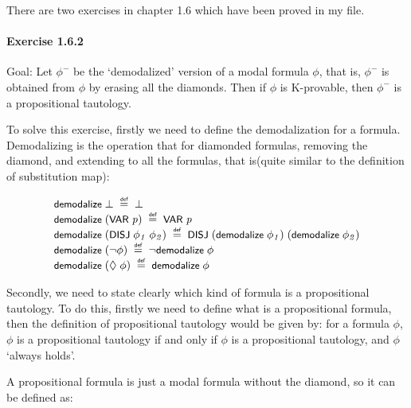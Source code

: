 \documentclass[letterpaper]{article}
\renewcommand{\HOLConst}[1]{{\textsf{\upshape\small #1}}}
\newenvironment{holmath}{\begin{displaymath}\begin{array}{l}}{\end{array}\end{displaymath}\ignorespacesafterend}
\begin{document}
There are two exercises in chapter 1.6 which have been proved in my file.

\paragraph{Exercise 1.6.2}

Goal: Let $\phi^-$ be the `demodalized' version of a modal formula $\phi$, that is, $\phi^-$ is obtained from $\phi$ by erasing all the diamonds. Then if $\phi$ is K-provable, then $\phi^-$ is a propositional tautology.

To solve this exercise, firstly we need to define the demodalization for a formula. Demodalizing is the operation that for diamonded formulas, removing the diamond, and extending to all the formulas, that is(quite similar to the definition of substitution map):

\begin{holmath}
  \HOLConst{demodalize}\;\HOLSymConst{\ensuremath{\bot}}\;\HOLSymConst{\HOLTokenDefEquality{}}\;\HOLSymConst{\ensuremath{\bot}}\\
\HOLConst{demodalize}\;(\HOLConst{VAR}\;\HOLFreeVar{p})\;\HOLSymConst{\HOLTokenDefEquality{}}\;\HOLConst{VAR}\;\HOLFreeVar{p}\\
\HOLConst{demodalize}\;(\HOLConst{DISJ}\;\HOLFreeVar{\ensuremath{\phi\sb{1}}}\;\HOLFreeVar{\ensuremath{\phi\sb{2}}})\;\HOLSymConst{\HOLTokenDefEquality{}}\;\HOLConst{DISJ}\;(\HOLConst{demodalize}\;\HOLFreeVar{\ensuremath{\phi\sb{1}}})\;(\HOLConst{demodalize}\;\HOLFreeVar{\ensuremath{\phi\sb{2}}})\\
\HOLConst{demodalize}\;(\HOLSymConst{\HOLTokenNeg{}}\HOLFreeVar{\ensuremath{\phi}})\;\HOLSymConst{\HOLTokenDefEquality{}}\;\HOLSymConst{\HOLTokenNeg{}}\HOLConst{demodalize}\;\HOLFreeVar{\ensuremath{\phi}}\\
\HOLConst{demodalize}\;(\HOLSymConst{\ensuremath{\Diamond}}\;\HOLFreeVar{\ensuremath{\phi}})\;\HOLSymConst{\HOLTokenDefEquality{}}\;\HOLConst{demodalize}\;\HOLFreeVar{\ensuremath{\phi}}
\end{holmath}

Secondly, we need to state clearly which kind of formula is a propositional tautology. To do this, firstly we need to define what is a propositional formula, then the definition of propositional tautology would be given by: for a formula $\phi$, $\phi$ is a propositional tautology if and only if $\phi$ is a propositional tautology, and $\phi$ `always holds'.

A propositional formula is just a modal formula without the diamond, so it can be defined as:
\end{document}
